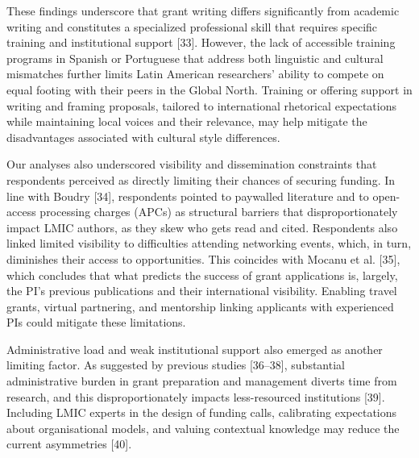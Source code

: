 \documentclass[
  letterpaper,
  DIV=11,
  numbers=noendperiod]{scrartcl}
\begin{document}
These findings underscore that grant writing differs significantly from
academic writing and constitutes a specialized professional skill that
requires specific training and institutional support {[}33{]}. However,
the lack of accessible training programs in Spanish or Portuguese that
address both linguistic and cultural mismatches further limits Latin
American researchers' ability to compete on equal footing with their
peers in the Global North. Training or offering support in writing and
framing proposals, tailored to international rhetorical expectations
while maintaining local voices and their relevance, may help mitigate
the disadvantages associated with cultural style differences.

Our analyses also underscored visibility and dissemination constraints
that respondents perceived as directly limiting their chances of
securing funding. In line with Boudry {[}34{]}, respondents pointed to
paywalled literature and to open-access processing charges (APCs) as
structural barriers that disproportionately impact LMIC authors, as they
skew who gets read and cited. Respondents also linked limited visibility
to difficulties attending networking events, which, in turn, diminishes
their access to opportunities. This coincides with Mocanu et al.
{[}35{]}, which concludes that what predicts the success of grant
applications is, largely, the PI's previous publications and their
international visibility. Enabling travel grants, virtual partnering,
and mentorship linking applicants with experienced PIs could mitigate
these limitations.

Administrative load and weak institutional support also emerged as
another limiting factor. As suggested by previous studies {[}36--38{]},
substantial administrative burden in grant preparation and management
diverts time from research, and this disproportionately impacts
less-resourced institutions {[}39{]}. Including LMIC experts in the
design of funding calls, calibrating expectations about organisational
models, and valuing contextual knowledge may reduce the current
asymmetries {[}40{]}.
\end{document}
